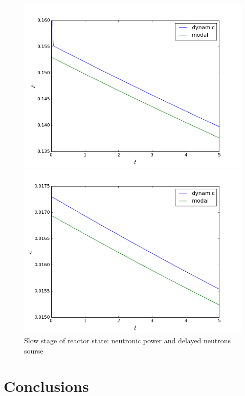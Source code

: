 \documentclass[a4paper]{jpconf}
\begin{document}
\begin{figure}[h]
\begin{center}
\begin{minipage}{0.49\linewidth}
    \includegraphics[width=1\linewidth] {15.png}
\end{minipage}
\hfill
\begin{minipage}{0.49\linewidth}
    \includegraphics[width=1\linewidth] {16.png}
\end{minipage}
\caption{Slow stage of reactor state: neutronic power and delayed neutrons sourse}
\label{fig:6}
\end{center}
\end{figure}

\section{Conclusions} 
\end{document}
